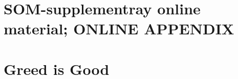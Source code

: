 \documentclass[10pt, letterpaper]{article}
\begin{document}
\begin{spacing}{1.8}
    






\section*{\Huge SOM-supplementray online material; ONLINE APPENDIX}


\section{Greed is Good}


\end{spacing}
\end{document}
